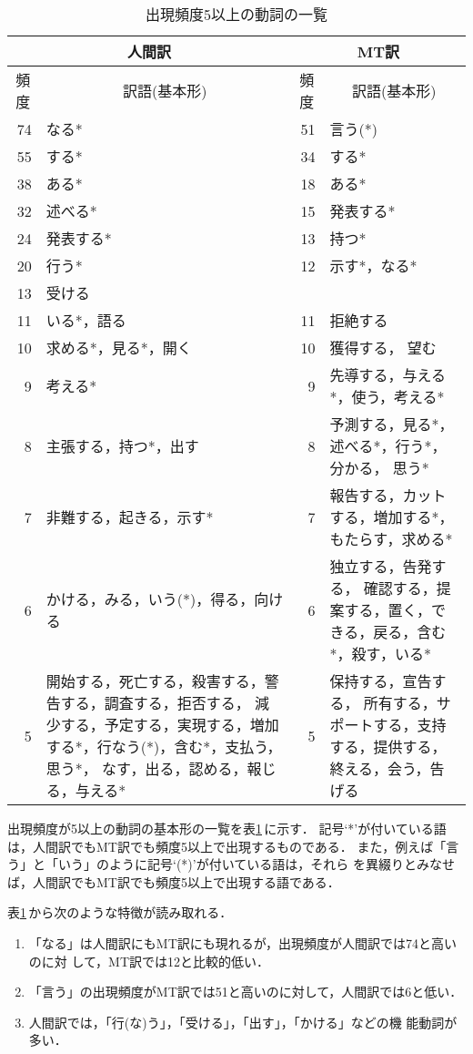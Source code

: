 \begin{table}[htbp]
\caption{出現頻度5以上の動詞の一覧}
\label{tab:hifreq-verb}
\begin{center}
\begin{tabular}{|r|p{}||r|p{}|}\hline
\multicolumn{2}{|c||}{人間訳} & \multicolumn{2}{c|}{MT訳} \\\hline\hline
\multicolumn{1}{|c}{頻度} & \multicolumn{1}{|c||}{訳語(基本形)} & 
\multicolumn{1}{c}{頻度} & \multicolumn{1}{|c|}{訳語(基本形)} \\\hline
74 & なる* & 51 & 言う(*) \\
55 & する* & 34 & する* \\
38 & ある* & 18 & ある* \\
32 & 述べる* & 15 & 発表する* \\
24 & 発表する* & 13 & 持つ* \\
20 & 行う* &  12 & 示す*，なる* \\
13 & 受ける & & \\
11 & いる*，語る & 11 & 拒絶する \\
10 & 求める*，見る*，開く & 10 & 獲得する， 望む \\
9 & 考える* & 9 & 先導する，与える*，使う，考える* \\
8 & 主張する，持つ*，出す & 8 & 予測する，見る*，述べる*，行う*，分かる，
思う* \\ 
7 & 非難する，起きる，示す* & 7 & 報告する，カットする，増加する*，
もたらす，求める* \\
6 & かける，みる，いう(*)，得る，向ける & 6 & 独立する，告発する，
確認する，提案する，置く，できる，戻る，含む*，殺す，いる* \\ 
5 & 開始する，死亡する，殺害する，警告する，調査する，拒否する，
減少する，予定する，実現する，増加する*，行なう(*)，含む*，支払う，思う*，
なす，出る，認める，報じる，与える* & 5 & 保持する，宣告する，
所有する，サポートする，支持する，提供する，終える，会う，告げる \\\hline  
\end{tabular}
\end{center}
\end{table}

出現頻度が5以上の動詞の基本形の一覧を表\ref{tab:hifreq-verb}\,に示す．
記号`*'が付いている語は，人間訳でもMT訳でも頻度5以上で出現するものである．
また，例えば「言う」と「いう」のように記号`(*)'が付いている語は，それら
を異綴りとみなせば，人間訳でもMT訳でも頻度5以上で出現する語である．

表\ref{tab:hifreq-verb}\,から次のような特徴が読み取れる．
\begin{enumerate}
\item\label{enumerate:suru-naru}
「なる」は人間訳にもMT訳にも現れるが，出現頻度が人間訳では74と高いのに対
して，MT訳では12と比較的低い．
\item\label{enumerate:say}
「言う」の出現頻度がMT訳では51と高いのに対して，人間訳では6と低い．
\item\label{enumerate:func-verb}
 人間訳では，「行(な)う」，「受ける」，「出す」，「かける」などの機
能動詞\cite{Muraki91}が多い．
\end{enumerate}


